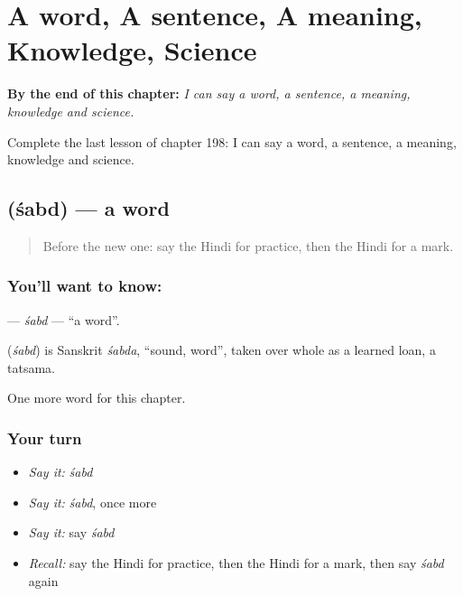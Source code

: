 
\chapter{A word, A sentence, A meaning, Knowledge, Science}
\label{ch:hi-a-word-a-sentence-a-meaning-knowledge-science}

\begin{chapteropening}
\textbf{By the end of this chapter:} \emph{I can say a word, a sentence, a meaning, knowledge and science.}

Complete the last lesson of chapter 198: I can say a word, a sentence, a meaning, knowledge and science.
\end{chapteropening}

\section[\texorpdfstring{\hi{शब्द} (śabd)}{शब्द (śabd)}]{ (śabd) — a word}

\label{lesson:HI-C198-sabd}



\begin{quote}
Before the new one: say the Hindi for practice, then the Hindi for a mark.
\end{quote}

\subsection*{You'll want to know: }
\textbf{} — \emph{śabd} — \textquotedblleft{}a word\textquotedblright{}.

\begin{cousinweb}
\textbf{} (\emph{śabd}) is Sanskrit \emph{śabda}, \textquotedblleft{}sound, word\textquotedblright{}, taken over whole as a learned loan, a tatsama.
\end{cousinweb}

\begin{grammarlens}[title={What you've built}]
One more word for this chapter.
\end{grammarlens}

\subsection*{Your turn}
\begin{itemize}
\raggedright
  \item \emph{Say it:} \emph{śabd}
  \item \emph{Say it:} \emph{śabd}, once more
  \item \emph{Say it:} say \emph{śabd}
  \item \emph{Recall:} say the Hindi for practice, then the Hindi for a mark, then say \emph{śabd} again
\end{itemize}

